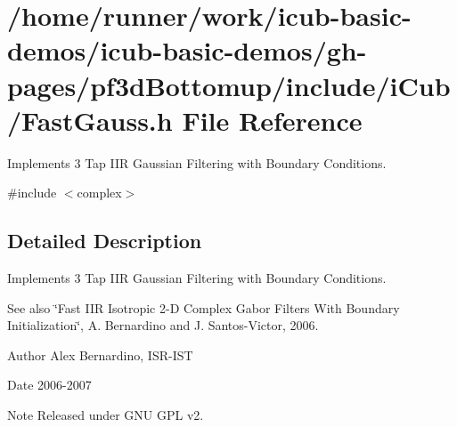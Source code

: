 \section{/home/runner/work/icub-\/basic-\/demos/icub-\/basic-\/demos/gh-\/pages/pf3d\+Bottomup/include/i\+Cub/\+Fast\+Gauss.h File Reference}
\label{FastGauss_8h}


Implements 3 Tap I\+IR Gaussian Filtering with Boundary Conditions.  


{\ttfamily \#include $<$complex$>$}\newline


\subsection{Detailed Description}
Implements 3 Tap I\+IR Gaussian Filtering with Boundary Conditions. 

\begin{DoxySeeAlso}{See also}
\char`\"{}\+Fast I\+I\+R Isotropic 2-\/\+D Complex Gabor Filters With Boundary Initialization\char`\"{}, A. Bernardino and J. Santos-\/\+Victor, 2006. 
\end{DoxySeeAlso}
\begin{DoxyAuthor}{Author}
Alex Bernardino, I\+S\+R-\/\+I\+ST 
\end{DoxyAuthor}
\begin{DoxyDate}{Date}
2006-\/2007 
\end{DoxyDate}
\begin{DoxyNote}{Note}
Released under G\+NU G\+PL v2. 
\end{DoxyNote}
